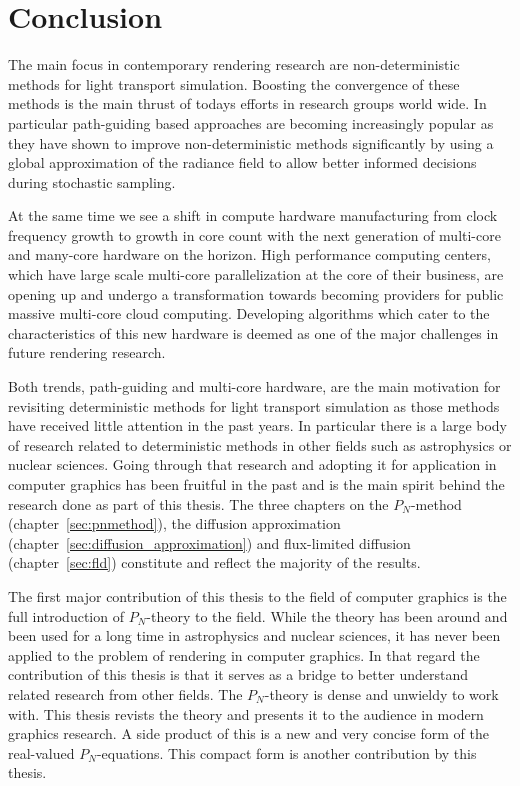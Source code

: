 \chapter{Conclusion}
%
\label{sec:conclusion}

The main focus in contemporary rendering research are non-deterministic methods for light transport simulation. Boosting the convergence of these methods is the main thrust of todays efforts in research groups world wide. In particular path-guiding based approaches are becoming increasingly popular as they have shown to improve non-deterministic methods significantly by using a global approximation of the radiance field to allow better informed decisions during stochastic sampling.

At the same time we see a shift in compute hardware manufacturing from clock frequency growth to growth in core count with the next generation of multi-core and many-core hardware on the horizon. High performance computing centers, which have large scale multi-core parallelization at the core of their business, are opening up and undergo a transformation towards becoming providers for public massive multi-core cloud computing. Developing algorithms which cater to the characteristics of this new hardware is deemed as one of the major challenges in future rendering research.

Both trends, path-guiding and multi-core hardware, are the main motivation for revisiting deterministic methods for light transport simulation as those methods have received little attention in the past years. In particular there is a large body of research related to deterministic methods in other fields such as astrophysics or nuclear sciences. Going through that research and adopting it for application in computer graphics has been fruitful in the past and is the main spirit behind the research done as part of this thesis. The three chapters on the $P_N$-method (chapter~\ref{sec:pnmethod}), the diffusion approximation (chapter~\ref{sec:diffusion_approximation}) and flux-limited diffusion (chapter~\ref{sec:fld}) constitute and reflect the majority of the results.

The first major contribution of this thesis to the field of computer graphics is the full introduction of $P_N$-theory to the field. While the theory has been around and been used for a long time in astrophysics and nuclear sciences, it has never been applied to the problem of rendering in computer graphics. In that regard the contribution of this thesis is that it serves as a bridge to better understand related research from other fields. The $P_N$-theory is dense and unwieldy to work with. This thesis revists the theory and presents it to the audience in modern graphics research. A side product of this is a new and very concise form of the real-valued $P_N$-equations. This compact form is another contribution by this thesis.


